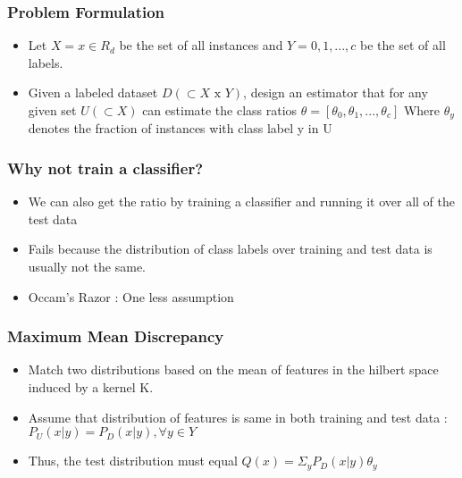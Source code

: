 \documentclass{beamer}
\begin{document}
\begin{frame}
 \frametitle{Problem Formulation}
 \begin{itemize}
  \item  Let $X = {x \in R_d }$ be the set of all instances and 
  $Y = {0, 1, . . . , c}$ be the  set of all labels.
 \medskip
\item Given a labeled dataset $D(\subset X\text{ x } Y)$, design an estimator that for any given set
$U (\subset X )$ can estimate the class ratios $\theta = [\theta_0 , \theta_1 , . . . , \theta_c ]$
Where  $\theta_y$ denotes the fraction of instances with class label y in U 
 \end{itemize}

\end{frame}
\begin{frame}
 \frametitle{Why not train a classifier?}
 \begin{itemize}
  \item We can also get the ratio by training a classifier and running it over all of the test data
  \medskip
  \item Fails because the distribution of class labels over training and test data is usually not the same.
\medskip
  \item Occam's Razor : One less assumption
 \end{itemize}

\end{frame}
\begin{frame}
 \frametitle{Maximum Mean Discrepancy}
 \begin{itemize}
  \item Match two distributions based on the mean of features in the hilbert space induced by a kernel K. \medskip
  \item Assume that distribution of features is same in both training and test data : 
    $P_U (x|y) = P_D (x|y), \forall y \in Y$ \medskip
  \item Thus, the test distribution must equal $Q(x) = \Sigma_{y} P_D (x|y)\theta_y$  \medskip
 \end{itemize}

\end{frame}
\end{document}
